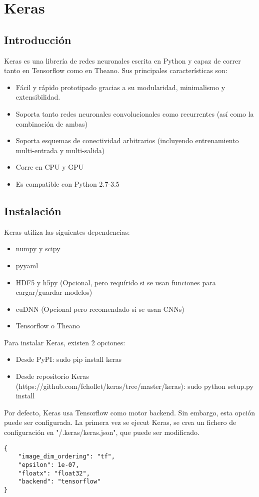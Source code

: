\chapter{Keras}
\section{Introducción}
Keras es una librería de redes neuronales escrita en Python y capaz de correr tanto en Tensorflow como en Theano. Sus principales características son:
\begin{itemize}[noitemsep]
\item Fácil y rápido prototipado gracias a su modularidad, minimalismo y extensibilidad.
\item Soporta tanto redes neuronales convolucionales como recurrentes (así como la combinación de ambas)
\item Soporta esquemas de conectividad arbitrarios (incluyendo entrenamiento multi-entrada y multi-salida)
\item Corre en CPU y GPU
\item Es compatible con Python 2.7-3.5
 \end{itemize}

 \section{Instalación}
 Keras utiliza las siguientes dependencias:
 \begin{itemize}[noitemsep]
\item numpy y scipy
\item pyyaml
\item HDF5 y h5py (Opcional, pero requírido si se usan funciones para cargar/guardar modelos)
\item cuDNN (Opcional pero recomendado si se usan CNNs)
\item Tensorflow o Theano
 \end{itemize}
 Para instalar Keras, existen 2 opciones:
 \begin{itemize}[noitemsep]
 \item Desde PyPI: sudo pip install keras
 \item Desde repositorio Keras (https://github.com/fchollet/keras/tree/master/keras): sudo python setup.py install
 \end{itemize}
 Por defecto, Keras usa Tensorflow como motor backend. Sin embargo, esta opción puede ser configurada. La primera vez se ejecut Keras, se crea un fichero de configuración en "/.keras/keras.json", que puede ser modificado.
\begin{lstlisting}
{
    "image_dim_ordering": "tf",
    "epsilon": 1e-07,
    "floatx": "float32",
    "backend": "tensorflow"
}
\end{lstlisting}

